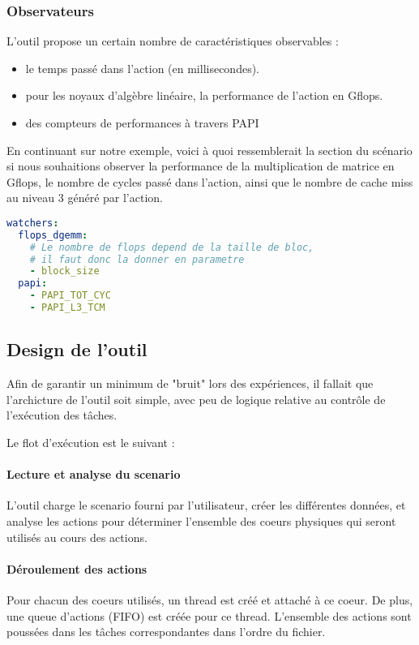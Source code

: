 \subsubsection{Observateurs}

L'outil propose un certain nombre de caractéristiques observables :

\begin{itemize}
  \item le temps passé dans l'action (en millisecondes).
  \item pour les noyaux d'algèbre linéaire, la performance de l'action en Gflops.
  \item des compteurs de performances à travers PAPI
\end{itemize}

En continuant sur notre exemple, voici à quoi ressemblerait la section du scénario si nous souhaitions observer la performance de la multiplication de matrice en Gflops, le nombre de cycles passé dans l'action, ainsi que le nombre de cache miss au niveau 3 généré par l'action.

\begin{lstlisting}[language=yaml,caption=Exemple de déclaration d'observateurs,label=lst:tool:watchers-example]
watchers:
  flops_dgemm:
    # Le nombre de flops depend de la taille de bloc,
    # il faut donc la donner en parametre
    - block_size
  papi:
    - PAPI_TOT_CYC
    - PAPI_L3_TCM
\end{lstlisting}

\subsection{Design de l'outil}

Afin de garantir un minimum de "bruit" lors des expériences, il fallait que l'archicture de l'outil soit simple, avec peu de logique relative au contrôle de l'exécution des tâches.

Le flot d'exécution est le suivant :

\paragraph{Lecture et analyse du scenario}
L'outil charge le scenario fourni par l'utilisateur, créer les différentes données, et analyse les actions pour déterminer l'ensemble des coeurs physiques qui seront utilisés au cours des actions.

\paragraph{Déroulement des actions}
Pour chacun des coeurs utilisés, un thread est créé et attaché à ce coeur. De plus, une queue d'actions (FIFO) est créée pour ce thread.
L'ensemble des actions sont poussées dans les tâches correspondantes dans l'ordre du fichier.

